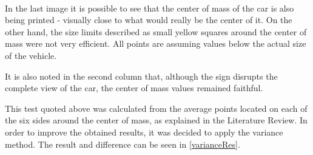 \begin{figure}[H]
{    }
    \mbox{%
    \qquad
    }
    \mbox{%
    \qquad
    }
\end{figure}
    
    In the last image it is possible to see that the center of mass of the car is also being printed - visually close to what would really be the center of it. On the other hand, the size limits described as small yellow squares around the center of mass were not very efficient. All points are assuming values below the actual size of the vehicle.

    It is also noted in the second column that, although the sign disrupts the complete view of the car, the center of mass values remained faithful.
    
    This test quoted above was calculated from the average points located on each of the six sides around the center of mass, as explained in the Literature Review. In order to improve the obtained results, it was decided to apply the variance method. The result and difference can be seen in \autoref{varianceRes}.

